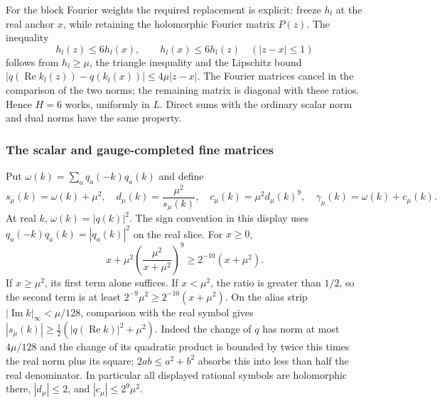 For the block Fourier weights the required replacement is explicit:
freeze $h_l$ at the real anchor $x$, while retaining the holomorphic
Fourier matrix $P(z)$. The inequality
\[
                    h_l(z)\leq6h_l(x),\qquad h_l(x)\leq6h_l(z)
                    \quad(|z-x|\leq1)
\]
follows from $h_l\geq\mu$, the triangle inequality and the Lipschitz
bound $|q(\operatorname{Re}k_l(z))-q(k_l(x))|\leq4\mu|z-x|$.
The Fourier matrices cancel in the comparison of the two norms; the
remaining matrix is diagonal with these ratios. Hence $H=6$ works,
uniformly in $L$. Direct sums with the ordinary scalar norm and dual
norms have the same property.

\subsubsection{The scalar and gauge-completed fine matrices}
Put $\omega(k)=\sum_a q_a(-k)q_a(k)$ and define
\[
 s_\mu(k)=\omega(k)+\mu^2,
 \quad d_\mu(k)=\frac{\mu^2}{s_\mu(k)},\quad
 c_\mu(k)=\mu^2d_\mu(k)^9,\quad
 \gamma_\mu(k)=\omega(k)+c_\mu(k).
\]
At real $k$, $\omega(k)=|q(k)|^2$. The sign convention in this display
uses $q_a(-k)q_a(k)=|q_a(k)|^2$ on the real slice.
For $x\geq0$,
\begin{equation}\label{eq:ex-scalar-weight-floor}
 x+\mu^2\left(\frac{\mu^2}{x+\mu^2}\right)^9
                   \geq2^{-10}(x+\mu^2).
\end{equation}
If $x\geq\mu^2$, its first term alone suffices. If $x<\mu^2$,
the ratio is greater than $1/2$, so the second term is at least
$2^{-9}\mu^2\geq2^{-10}(x+\mu^2)$.
On the alias strip $|\operatorname{Im}k|_\infty<\mu/128$,
comparison with the real symbol gives
$|s_\mu(k)|\geq\tfrac12(|q(\operatorname{Re}k)|^2+\mu^2)$.
Indeed the change of $q$ has norm at most $4\mu/128$ and the change
of its quadratic product is bounded by twice this times the real norm
plus its square; $2ab\leq a^2+b^2$ absorbs this into less than half
the real denominator. In particular all displayed rational symbols are
holomorphic there, $|d_\mu|\leq2$, and
$|c_\mu|\leq2^9\mu^2$.


